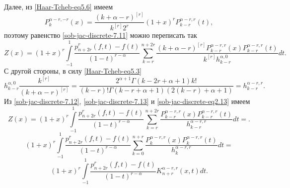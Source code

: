 Далее, из \eqref{Haar-Tcheb-eq5.6} имеем
$$
P_{k}^{\alpha-r,-r}(x)=\frac{(k+\alpha-r)^{[r]}}{k^{[r]}2^r}(1+x)^rP_{k-r}^{\alpha-r,r}(t),
$$
поэтому равенство \eqref{sob-jac-discrete-7.11} можно переписать так
\begin{equation}\label{sob-jac-discrete-7.12}
 Z(x)=(1+x)^r\int\limits_{-1}^1\frac{p_{n+2r}^r(f,t)-f(t)}{(1-t)^{r-\alpha}}\sum_{k=r}^{n+2r} \frac{(k+\alpha-r)^{[r]} P_{k-r}^{\alpha-r,r}(x)P_{k-r}^{\alpha-r,r}(t)}{k^{[r]}h_{k-r}^{\alpha,0}}dt.
     \end{equation}
С другой стороны, в силу  \eqref{Haar-Tcheb-eq5.3}
\begin{equation}\label{sob-jac-discrete-7.13}
  h_{k-r}^{\alpha,0}\frac{k^{[r]}}{(k+\alpha-r)^{[r]}}=\frac{2^{\alpha+1}\Gamma(k-2r+\alpha+1)k!}{(k-r)!\Gamma(k-r+\alpha+1)(2(k-r)+\alpha+1)}=
  h_{k-r}^{\alpha-r,r}.
     \end{equation}
Из \eqref{sob-jac-discrete-7.12}, \eqref{sob-jac-discrete-7.13} и \eqref{sob-jac-discrete-eq2.13} имеем
$$
Z(x)=(1+x)^r\int\limits_{-1}^1\frac{p_{n+2r}^r(f,t)-f(t)}{(1-t)^{r-\alpha}}\sum_{k=r}^{n+2r} \frac{ P_{k-r}^{\alpha-r,r}(x)P_{k-r}^{\alpha-r,r}(t)}{h_{k-r}^{\alpha-r,r}}dt=.
 $$
$$
 (1+x)^r\int\limits_{-1}^1\frac{p_{n+2r}^r(f,t)-f(t)}{(1-t)^{r-\alpha}}\sum_{k=0}^{n+r} \frac{ P_{k}^{\alpha-r,r}(x)P_{k}^{\alpha-r,r}(t)}{h_{k}^{\alpha-r,r}}dt=
 $$
 \begin{equation}\label{sob-jac-discrete-7.14}
 (1+x)^r\int\limits_{-1}^1\frac{p_{n+2r}^r(f,t)-f(t)}{(1-t)^{r-\alpha}}K_{n+r}^{\alpha-r,r}(x,t)dt.
     \end{equation}

